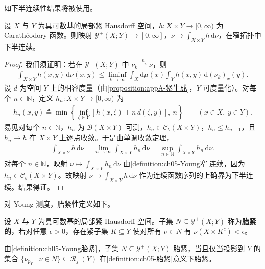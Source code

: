 \documentclass[../../main.tex]{subfiles}%
\begin{document}
如下半连续性结果将被使用。

\begin{proposition}\label{proposition:ch05-Caratheodory下半连续}
设 $X$ 与 $Y$ 为具可数基的局部紧 Hausdorff 空间，$h:X\times Y\to[0,\infty)$ 为 Carathéodory 函数。则映射 $\mathcal{Y}^+(X;Y)\to[0,\infty]$，$\nu\mapsto\int_{X\times Y}h\,\mathrm{d}\nu$，在窄拓扑中下半连续。
\end{proposition}

\begin{proof}
我们须证明：若在 $\mathcal{Y}^+(X;Y)$ 中 $\nu_k\stackrel{n}{\rightharpoonup}\nu$，则
\begin{align}
\int_{X\times Y}h(x,y)\,\mathrm{d}\nu(x,y)
\leqslant\liminf_{k\to\infty}\int_X\mathrm{d}\mu(x)\int_Y h(x,y)\,\mathrm{d}(\nu_k)_x(y).\label{align:ch05-5.62}
\end{align}
设 $d$ 为空间 $Y$ 上的相容度量（由\cref{proposition:appA-紧生成}，$Y$ 可度量化）。对每个 $n\in\mathbb{N}$，定义 $h_n:X\times Y\to[0,\infty)$ 为
\begin{align*}
h_n(x,y)\triangleq \min\left\{\inf_{\zeta\in Y}[h(x,\zeta)+n\,d(\zeta,y)],\ n\right\}
\qquad(x\in X,\ y\in Y).
\end{align*}
易见对每个 $n\in\mathbb{N}$，$h_n$ 为 $\mathscr{B}(X\times Y)$-可测，$h_n\in\mathcal{C}_b(X\times Y)$，$h_n\leqslant h_{n+1}$，且 $h_n\to h$ 在 $X\times Y$ 上逐点收敛。于是由单调收敛定理，
\begin{align*}
\int_{X\times Y}h\,\mathrm{d}\nu
=\lim_{n\to\infty}\int_{X\times Y}h_n\,\mathrm{d}\nu
=\sup_{n\in\mathbb{N}}\int_{X\times Y}h_n\,\mathrm{d}\nu.
\end{align*}
对每个 $n\in\mathbb{N}$，映射 $\nu\mapsto\int_{X\times Y}h_n\,\mathrm{d}\nu$ 由\cref{definition:ch05-Young窄}连续，因为 $h_n\in\mathcal{C}_b(X\times Y)$。故映射 $\nu\mapsto\int_{X\times Y}h\,\mathrm{d}\nu$ 作为连续函数序列的上确界为下半连续。结果得证。
\end{proof}

对 Young 测度，胎紧性定义如下。

\begin{definition}\label{definition:ch05-Young胎紧}
设 $X$ 与 $Y$ 为具可数基的局部紧 Hausdorff 空间。子集 $N\subseteq\mathcal{Y}^+(X;Y)$ 称为\textbf{胎紧的}，若对任意 $\epsilon>0$，存在紧子集 $K\subseteq Y$ 使对所有 $\nu\in N$ 有 $\nu(X\times K^c)<\epsilon$。
\end{definition}

\begin{remark}\label{remark:ch05-Young胎紧投影}
由\cref{definition:ch05-Young胎紧}，子集 $N\subseteq\mathcal{Y}^+(X;Y)$ 胎紧，当且仅当投影到 $Y$ 的集合 $\{\nu_{p_Y}\mid\nu\in N\}\subseteq\mathscr{R}^+_f(Y)$ 在\cref{definition:ch05-胎紧}意义下胎紧。
\end{remark}
\end{document}
